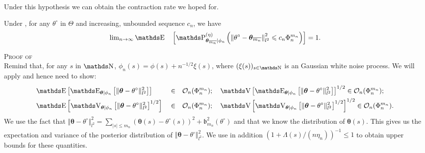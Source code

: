 Under this hypothesis we can obtain the contraction rate we hoped for.

\begin{cor}\label{COR_BAYES_GAUSS_CONTRACT_SIEVE}
Under , for any $\theta^{\circ}$ in $\Theta$ and increasing, unbounded sequence $c_{n}$, we have
\begin{alignat*}{3}
& && \lim\nolimits_{n \rightarrow \infty} \E&&\left[\P_{\boldsymbol{\theta}_{\overline{m_{n}}}\vert \phi_{n}}^{(\eta)}\left(\left\Vert \theta^{\circ} - \boldsymbol{\theta}_{\overline{m_{n}}}\right\Vert_{l^{2}}^{2} \leq c_{n} \Phi^{m_{n}}_{n} \right)\right] = 1.
\end{alignat*}
\reEnd
\end{cor}

\begin{pro}{\textsc{Proof of }\\}\label{PRO_BAYES_GAUSS_CONTRACT_SIEVE}
Remind that, for any $s$ in $\N$, $\phi_{n}(s) = \phi(s) + n^{-1/2} \xi(s)$, where $(\xi(s))_{s \in \N}$ is an \iid Gaussian white noise process.
We will apply  and hence need to show:
\begin{alignat*}{3}
& \E\left[\E_{\boldsymbol{\theta} \vert \phi_{n}}\left[\Vert \boldsymbol{\theta} - \theta^{\circ} \Vert_{l^{2}}^{2}\right]\right] && \in && \mathcal{O}_{n}(\Phi_{n}^{m_{n}}); \quad \V\left[\E_{\boldsymbol{\theta}\vert \phi_{n}}\left[\Vert \boldsymbol{\theta} - \theta^{\circ} \Vert_{l^{2}}^{2}\right]\right]^{1/2} \in \mathcal{O}_{n}(\Phi_{n}^{m_{n}});\\
&\E\left[\V_{\boldsymbol{\theta}\vert \phi_{n}}\left[\Vert \boldsymbol{\theta} - \theta^{\circ} \Vert_{l^{2}}^{2}\right]^{1/2}\right] && \in && \mathcal{O}_{n}(\Phi_{n}^{m_{n}}); \quad \V\left[\V_{\boldsymbol{\theta}\vert \phi_{n}}\left[\Vert \boldsymbol{\theta} - \theta^{\circ} \Vert_{l^{2}}^{2}\right]^{1/2}\right]^{1/2} \in \mathcal{O}_{n}(\Phi_{n}^{m_{n}}).
\end{alignat*}
We use the fact that $\Vert \boldsymbol{\theta} - \theta^{\circ} \Vert_{l^{2}}^{2} = \sum\nolimits_{\vert s \vert \leq m_{n}} \left( \boldsymbol{\theta}(s) - \theta^{\circ}(s)\right)^{2} + \mathfrak{b}_{m_{n}}^{2}(\theta^{\circ})$ and that we know the distribution of $\boldsymbol{\theta}(s)$.
This gives us the expectation and variance of the posterior distribution of $\Vert \boldsymbol{\theta} - \theta^{\circ} \Vert_{l^{2}}^{2}$.
We use in addition $(1 + \Lambda(s)/(n \eta_{n}))^{-1} \leq 1$ to obtain upper bounds for these quantities.

\end{pro}

